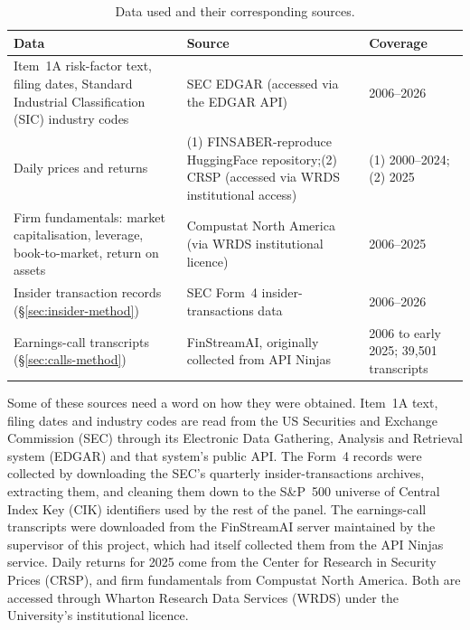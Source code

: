 \documentclass[logo,msc,ai]{infthesis}        %
\begin{document}
\begin{table}[h]
\footnotesize
\caption{Data used and their corresponding sources.}
\label{tab:datasources}
\begin{tabularx}{\textwidth}{@{}L{3.5cm}XL{2.9cm}@{}}
\toprule
\textbf{Data} & \textbf{Source} & \textbf{Coverage} \\
\midrule
Item~1A risk-factor text, filing dates, Standard Industrial Classification (SIC) industry codes &
SEC EDGAR (accessed via the EDGAR API)\footnotemark[1] &
2006--2026 \\
\addlinespace
Daily prices and returns &
(1) FINSABER-reproduce HuggingFace repository;\footnotemark[2] (2) CRSP (accessed via WRDS institutional access)\footnotemark[3] &
(1) 2000--2024; (2) 2025 \\
\addlinespace
Firm fundamentals: market capitalisation, leverage, book-to-market, return on assets &
Compustat North America (via WRDS institutional licence)\footnotemark[4] &
2006--2025 \\
\addlinespace
Insider transaction records (\S\ref{sec:insider-method}) &
SEC Form~4 insider-transactions data\footnotemark[5] &
2006--2026 \\
\addlinespace
Earnings-call transcripts (\S\ref{sec:calls-method}) &
FinStreamAI, originally collected from API Ninjas\footnotemark[6] &
2006 to early 2025; 39{,}501 transcripts \\
\bottomrule
\end{tabularx}
\end{table}


Some of these sources need a word on how they were obtained. Item~1A text, filing dates and industry codes are read from the US Securities and Exchange Commission (SEC) through its Electronic Data Gathering, Analysis and Retrieval system (EDGAR) and that system's public API. The Form~4 records were collected by downloading the SEC's quarterly insider-transactions archives, extracting them, and cleaning them down to the S\&P~500 universe of Central Index Key (CIK) identifiers used by the rest of the panel. The earnings-call transcripts were downloaded from the FinStreamAI server maintained by the supervisor of this project, which had itself collected them from the API Ninjas service. Daily returns for 2025 come from the Center for Research in Security Prices (CRSP), and firm fundamentals from Compustat North America. Both are accessed through Wharton Research Data Services (WRDS) under the University's institutional licence.
\end{document}
